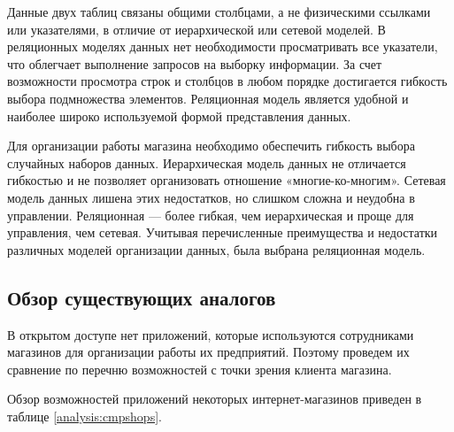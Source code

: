 Данные двух таблиц связаны общими столбцами, а не физическими ссылками или указателями, в отличие от иерархической или сетевой моделей. В реляционных моделях данных нет необходимости просматривать все указатели, что облегчает выполнение запросов на выборку информации. За счет возможности просмотра строк и столбцов в любом порядке достигается гибкость выбора подмножества элементов. Реляционная модель является удобной и наиболее широко используемой формой представления данных.

\pagebreak

Для организации работы магазина необходимо обеспечить гибкость выбора случайных наборов данных. Иерархическая модель данных не отличается гибкостью и не позволяет организовать отношение «многие-ко-многим». Сетевая модель данных лишена этих недостатков, но слишком сложна и неудобна в управлении. Реляционная — более гибкая, чем иерархическая и проще для управления, чем сетевая. Учитывая перечисленные преимущества и недостатки различных моделей организации данных, была выбрана реляционная модель.

\subsection{Обзор существующих аналогов}

В открытом доступе нет приложений, которые используются сотрудниками магазинов для организации работы их предприятий. Поэтому проведем их сравнение по перечню возможностей с точки зрения клиента магазина.

Обзор возможностей приложений некоторых интернет-магазинов приведен в таблице \ref{analysis:cmpshops}.

